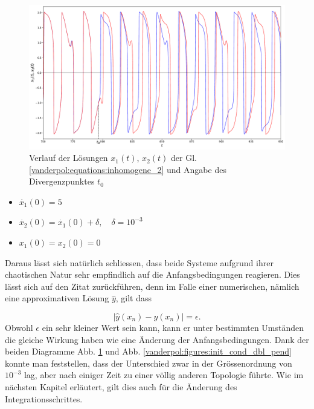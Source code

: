\begin{figure}
\includegraphics[width=\textwidth]{papers/vanderpol/figures/initial_cond_VDP.pdf}
\caption{Verlauf der Lösungen $x_1(t)$, $x_2(t)$ der Gl. \ref{vanderpol:equations:inhomogene_2} und Angabe des Divergenzpunktes $t_0$ \label{vanderpol:figures:init_cond_VDP}}
\end{figure}

\begin{itemize}
\item
$\dot{x_1}(0) = 5$
\item
$\dot{x_2}(0) = \dot{x_1}(0) + \delta, \quad \delta = 10^{-3}$ 
\item
$x_1(0) = x_2(0) = 0$
\end{itemize}
Daraus lässt sich natürlich schliessen, dass beide Systeme aufgrund ihrer chaotischen Natur sehr empfindlich auf die Anfangsbedingungen reagieren. Dies lässt sich auf den Zitat zurückführen, denn im Falle einer numerischen, nämlich eine approximativen Lösung $\hat{y}$, gilt dass

\begin{equation} 
|\hat{y}(x_n) - y(x_n)| = \epsilon.
\end{equation}
Obwohl $\epsilon$ ein sehr kleiner Wert sein kann, kann er unter bestimmten Umständen die gleiche Wirkung haben wie eine Änderung der Anfangsbedingungen. Dank der beiden Diagramme Abb.   \ref{vanderpol:figures:init_cond_VDP} und Abb. \ref{vanderpol:figures:init_cond_dbl_pend} konnte man feststellen, dass der Unterschied zwar in der Grössenordnung von $10^{-3}$ lag, aber nach einiger Zeit zu einer völlig anderen Topologie führte. Wie im nächsten Kapitel erläutert, gilt dies auch für die Änderung des Integrationsschrittes.

